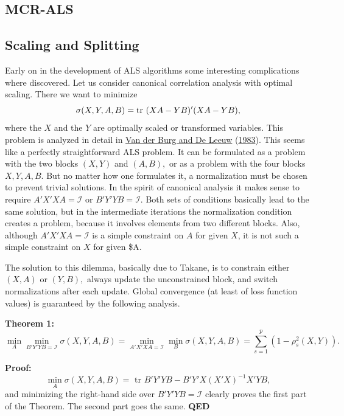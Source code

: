 \documentclass[
  12pt,
]{book}
\begin{document}
\hypertarget{alternatingleastsquares:examples:mcrals}{%
\subsection{MCR-ALS}\label{alternatingleastsquares:examples:mcrals}}

\hypertarget{alternatingleastsquares:examples:scalingandsplitting}{%
\subsection{Scaling and Splitting}\label{alternatingleastsquares:examples:scalingandsplitting}}

Early on in the development of ALS algorithms some interesting
complications where discovered. Let us consider canonical
correlation analysis with optimal scaling. There we want
to minimize
\[
\sigma(X,Y,A,B)=\hbox{tr }(XA-YB)'(XA-YB),
\]
where the \(X\) and the \(Y\) are optimally scaled or transformed
variables. This problem is analyzed in detail in \protect\hyperlink{ref-vanderburg_deleeuw_A_83}{Van der Burg and De Leeuw} (\protect\hyperlink{ref-vanderburg_deleeuw_A_83}{1983}). This seems like a perfectly
straightforward ALS problem. It can be formulated as a problem
with the two blocks \((X,Y)\)
and \((A,B),\) or as a problem
with the four blocks \(X,Y,A,B.\) But no matter how one
formulates it, a normalization must be chosen to prevent
trivial solutions. In the spirit of canonical analysis
it makes sense to
require \(A'X'XA=\mathcal{I}\)
or \(B'Y'YB=\mathcal{I}.\)
Both sets of conditions
basically lead to the same solution, but in the intermediate iterations
the normalization condition creates a problem, because
it involves elements from two different blocks. Also,
although \(A'X'XA=\mathcal{I}\) is a simple constraint on \(A\) for
given \(X\), it is not such a simple constraint on \(X\)
for given \$A.

The solution to this dilemma, basically due to Takane, is
to constrain either \((X,A)\) or \((Y,B),\) always update
the unconstrained block, and switch normalizations after
each update. Global convergence (at least of loss function
values) is guaranteed by the following analysis.

\textbf{Theorem 1: }
\[\min_A\min_{B'Y'YB=\mathcal{I}}\sigma(X,Y,A,B)=
\min_{A'X'XA=\mathcal{I}}\min_B\sigma(X,Y,A,B)=\sum_{s=1}^p(1-\rho_s^2(X,Y)).
\]

\textbf{Proof:}
\[
\min_A\sigma(X,Y,A,B)=\text{ tr }B'Y'YB-B'Y'X(X'X)^{-1}X'YB,
\]
and minimizing the right-hand side over \(B'Y'YB=\mathcal{I}\) clearly
proves the first part of the Theorem. The second part goes
the same.
\textbf{QED}
\end{document}
